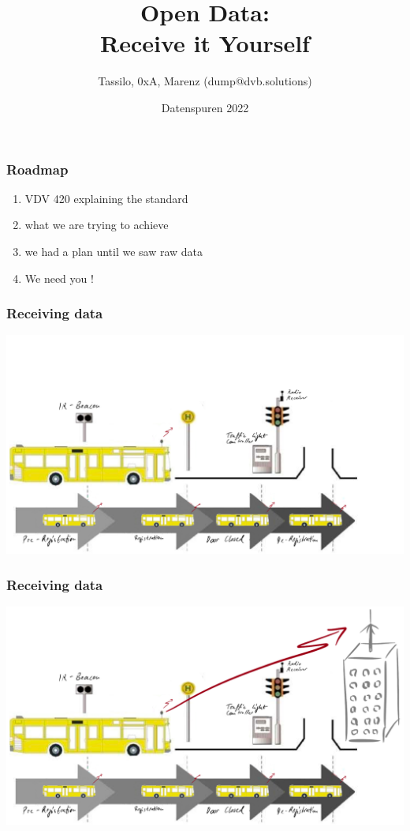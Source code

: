 \documentclass{beamer}
\title{Open Data: \\ Receive it Yourself}
\date[ISPN ’80]{Datenspuren 2022}
\author[]{Tassilo, 0xA, Marenz (dump@dvb.solutions)}
\begin{document}
\begin{frame}\titlepage
\end{frame}
  
\begin{frame} 
\frametitle{Roadmap} 

\begin{enumerate}
    \item VDV 420 explaining the standard
    \item what we are trying to achieve
    \item we had a plan until we saw raw data
    \item We need you !
\end{enumerate}

\end{frame}

\begin{frame}
\frametitle{Receiving data}
\includegraphics[width=\textwidth]{figs/lsa-beeinflussungs-stecke.pdf}
\end{frame}

\begin{frame}
\frametitle{Receiving data}
\includegraphics[width=\textwidth]{figs/lsa-beeinflussungs-stecke-mit-antenne.pdf}
\end{frame}
\end{document}
